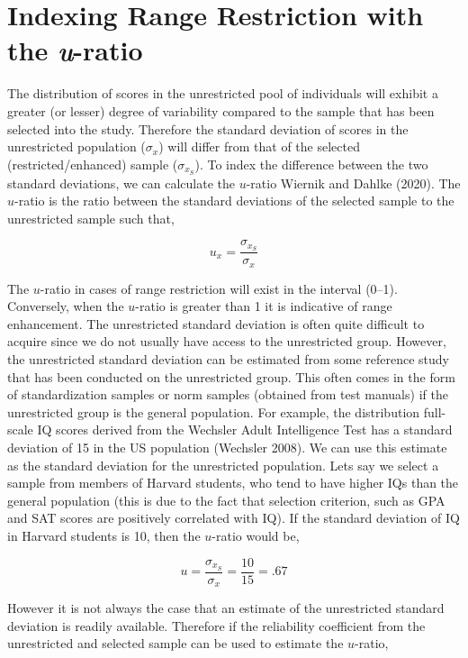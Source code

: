 \documentclass[
  letterpaper,
  DIV=11,
  numbers=noendperiod]{scrreprt}
\begin{document}
\hypertarget{indexing-range-restriction-with-the-u-ratio-1}{%
\section{\texorpdfstring{Indexing Range Restriction with the
\emph{u}-ratio}{Indexing Range Restriction with the u-ratio}}\label{indexing-range-restriction-with-the-u-ratio-1}}

The distribution of scores in the unrestricted pool of individuals will
exhibit a greater (or lesser) degree of variability compared to the
sample that has been selected into the study. Therefore the standard
deviation of scores in the unrestricted population (\(\sigma_x\)) will
differ from that of the selected (restricted/enhanced) sample
(\(\sigma_{x_{S}}\)). To index the difference between the two standard
deviations, we can calculate the \(u\)-ratio Wiernik and Dahlke (2020).
The \(u\)-ratio is the ratio between the standard deviations of the
selected sample to the unrestricted sample such that,

\[
u_x = \frac{\sigma_{x_S}}{\sigma_x}
\]

The \(u\)-ratio in cases of range restriction will exist in the interval
(0--1). Conversely, when the \(u\)-ratio is greater than 1 it is
indicative of range enhancement. The unrestricted standard deviation is
often quite difficult to acquire since we do not usually have access to
the unrestricted group. However, the unrestricted standard deviation can
be estimated from some reference study that has been conducted on the
unrestricted group. This often comes in the form of standardization
samples or norm samples (obtained from test manuals) if the unrestricted
group is the general population. For example, the distribution
full-scale IQ scores derived from the Wechsler Adult Intelligence Test
has a standard deviation of 15 in the US population (Wechsler 2008). We
can use this estimate as the standard deviation for the unrestricted
population. Lets say we select a sample from members of Harvard
students, who tend to have higher IQs than the general population (this
is due to the fact that selection criterion, such as GPA and SAT scores
are positively correlated with IQ). If the standard deviation of IQ in
Harvard students is 10, then the \(u\)-ratio would be,

\[
u =  \frac{\sigma_{x_S}}{\sigma_x} = \frac{10}{15}= .67
\]

However it is not always the case that an estimate of the unrestricted
standard deviation is readily available. Therefore if the reliability
coefficient from the unrestricted and selected sample can be used to
estimate the \(u\)-ratio,
\end{document}
